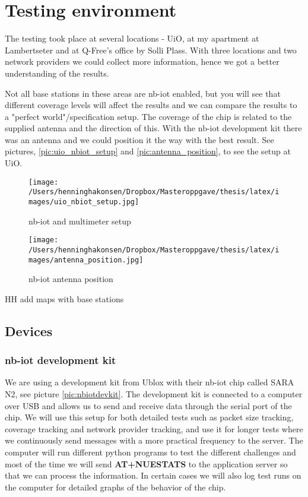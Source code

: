 \documentclass[USenglish]{ifimaster}  %
\begin{document}
\section{Testing environment} \label{section:testingenv}
The testing took place at several locations - UiO, at my apartment at Lambertseter and at Q-Free's office by Solli Plass. With three locations and two network providers we could collect more information, hence we got a better understanding of the results.

Not all base stations in these areas are \acrshort{nb-iot} enabled, but you will see that different coverage levels will affect the results and we can compare the results to a "perfect world"/specification setup. The coverage of the chip is related to the supplied antenna and the direction of this. With the \acrshort{nb-iot} development kit there was an antenna and we could position it the way with the best result. See pictures, \vref{pic:uio_nbiot_setup} and \vref{pic:antenna_position}, to see the setup at UiO.

\begin{figure}[ht]
  \centering\texttt{[image: /Users/henninghakonsen/Dropbox/Masteroppgave/thesis/latex/images/uio\_nbiot\_setup.jpg]}
  \caption{\acrshort{nb-iot} and multimeter setup}
  \label{pic:uio_nbiot_setup}
\end{figure}

\begin{figure}[ht]
  \centering\texttt{[image: /Users/henninghakonsen/Dropbox/Masteroppgave/thesis/latex/images/antenna\_position.jpg]}
  \caption{\acrshort{nb-iot} antenna position}
  \label{pic:antenna_position}
\end{figure}

HH add maps with base stations

\subsection{Devices} \label{ssection:devices}
\subsubsection{\acrshort{nb-iot} development kit}
We are using a development kit from Ublox with their \acrshort{nb-iot} chip called SARA N2, see picture \vref{pic:nbiotdevkit}. The development kit is connected to a computer over USB and allows us to send and receive data through the serial port of the chip. We will use this setup for both detailed tests such as packet size tracking, coverage tracking and network provider tracking, and use it for longer tests where we continuously send messages with a more practical frequency to the server. The computer will run different python programs to test the different challenges and most of the time we will send \textbf{AT+NUESTATS} to the application server so that we can process the information. In certain cases we will also log test runs on the computer for detailed graphs of the behavior of the chip.
\end{document}
